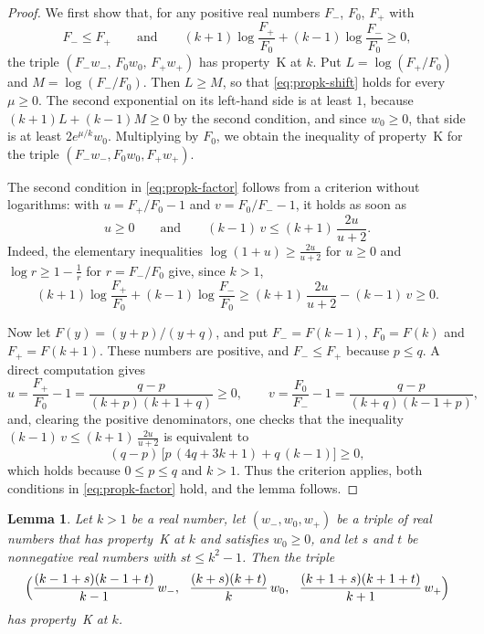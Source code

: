 \documentclass{amsart}
\newtheorem{lemma}[theorem]{Lemma}
\theoremstyle{definition}
\theoremstyle{remark}
\numberwithin{equation}{section}
\begin{document}
\begin{proof}
We first show that, for any positive real numbers $F_-$, $F_0$, $F_+$ with
\begin{equation}\label{eq:propk-factor}
F_-\le F_+\qquad\text{and}\qquad(k+1)\log\frac{F_+}{F_0}+(k-1)\log\frac{F_-}{F_0}\ge 0,
\end{equation}
the triple $(F_-w_-,\,F_0w_0,\,F_+w_+)$ has property~K at $k$. Put $L=\log(F_+/F_0)$ and $M=\log(F_-/F_0)$. Then $L\ge M$, so that \eqref{eq:propk-shift} holds for every $\mu\ge 0$. The second exponential on its left-hand side is at least $1$, because $(k+1)L+(k-1)M\ge 0$ by the second condition, and since $w_0\ge 0$, that side is at least $2e^{\mu/k}w_0$. Multiplying by $F_0$, we obtain the inequality of property~K for the triple $(F_-w_-,F_0w_0,F_+w_+)$.

The second condition in \eqref{eq:propk-factor} follows from a criterion without logarithms: with $u=F_+/F_0-1$ and $v=F_0/F_--1$, it holds as soon as
\[
u\ge 0\qquad\text{and}\qquad(k-1)\,v\le(k+1)\,\frac{2u}{u+2}.
\]
Indeed, the elementary inequalities $\log(1+u)\ge\frac{2u}{u+2}$ for $u\ge 0$ and $\log r\ge 1-\frac1r$ for $r=F_-/F_0$ give, since $k>1$,
\[
(k+1)\log\frac{F_+}{F_0}+(k-1)\log\frac{F_-}{F_0}\ge(k+1)\,\frac{2u}{u+2}-(k-1)\,v\ge 0.
\]

Now let $F(y)=(y+p)/(y+q)$, and put $F_-=F(k-1)$, $F_0=F(k)$ and $F_+=F(k+1)$. These numbers are positive, and $F_-\le F_+$ because $p\le q$. A direct computation gives
\[
u=\frac{F_+}{F_0}-1=\frac{q-p}{(k+p)(k+1+q)}\ge 0,\qquad v=\frac{F_0}{F_-}-1=\frac{q-p}{(k+q)(k-1+p)},
\]
and, clearing the positive denominators, one checks that the inequality $(k-1)\,v\le(k+1)\,\frac{2u}{u+2}$ is equivalent to
\[
(q-p)\,\bigl[p\,(4q+3k+1)+q\,(k-1)\bigr]\ge 0,
\]
which holds because $0\le p\le q$ and $k>1$. Thus the criterion applies, both conditions in \eqref{eq:propk-factor} hold, and the lemma follows.
\end{proof}

\begin{lemma}\label{lem:kproduct}
Let $k>1$ be a real number, let $(w_-,w_0,w_+)$ be a triple of real numbers that has property~K at $k$ and satisfies $w_0\ge 0$, and let $s$ and $t$ be nonnegative real numbers with $st\le k^2-1$. Then the triple
\[
\Bigl(\frac{(k-1+s)(k-1+t)}{k-1}\,w_-,\ \ \frac{(k+s)(k+t)}{k}\,w_0,\ \ \frac{(k+1+s)(k+1+t)}{k+1}\,w_+\Bigr)
\]
has property~K at $k$.
\end{lemma}
\end{document}
